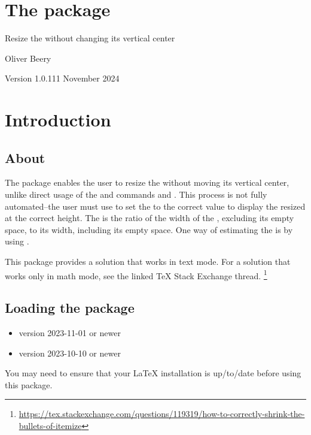 \documentclass{beery}
\begin{document}
\section*
  {%
    The  package%
  }

Resize the  without changing its vertical center

Oliver Beery

Version 1.0.1\quad{}11 November 2024


\section{Introduction}
\label{sec:intro}

\subsection{About}

The  package enables the user to resize the  without moving its vertical center, unlike direct usage of the \LaTeXe{} and  commands  and .
This process is not fully automated\---the user must use  to set the \textbulletfactor{} to the correct value to display the resized  at the correct height.
The \textbulletfactor{} is the ratio of the width of the , excluding its empty space, to its width, including its empty space.
One way of estimating the \textbulletfactor{} is by using .

This package provides a solution that works in text mode.
For a solution that works only in math mode, see the linked \TeX{} Stack Exchange thread.%
\footnote{\url{https://tex.stackexchange.com/questions/119319/how-to-correctly-shrink-the-bullets-of-itemize}}

\subsection{Loading the package}

\begin{itemize}
  \item \LaTeXe{} version 2023-11-01 or newer
  \item {} version 2023-10-10 or newer
\end{itemize}

You may need to ensure that your \LaTeX{} installation is up\-/to\-/date before using this package.
\end{document}
